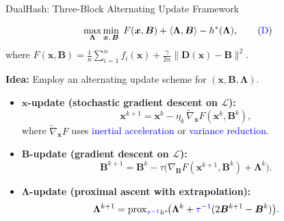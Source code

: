 \documentclass[mathserif,compress,override,9pt]{beamer}
\numberwithin{equation}{section}
\newcommand{\nii}{\noindent}
\newcommand{\prox}{\mathrm{prox}}
\newcommand{\bx}{\bm{x}}
\newcommand{\bD}{\bm{D}}
\newcommand{\bY}{\bm{Y}}
\newcommand{\bB}{\bm{B}}
\newcommand{\bLmbd}{\bm{\Lambda}}
\newcommand{\calL}{\mathcal{L}}
\newcommand{\blue}[1]{\textcolor{blue}{#1}}
\theoremstyle{remark}
\begin{document}
\begin{frame}{DualHash: Three-Block Alternating Update Framework}
\small

\begin{gather}
\max_{\bLmbd}\min_{\bx,\,\bB}\;F(\bx,\bB)+\langle\bLmbd,\bB\rangle-h^*(\bLmbd), \tag{\blue{D}}
\end{gather}
where $F(\bx,\bB)=\tfrac{1}{n}\sum_{i=1}^n f_i(\bx)+\tfrac{\gamma}{2n}\|\bD(\bx)-\bB\|^2$.


\nii\textbf{Idea:} Employ an alternating update scheme for $(\bx,\bB,\bLmbd)$.

\vspace{0.15cm}
\begin{itemize}
\item[\blue{$\triangleright$}] \textbf{$\bx$-update (stochastic gradient descent on $\calL$):}
\[
\bx^{k+1} = \bx^k - \eta_k\,\widetilde\nabla_{\bx} F(\bx^k,\bB^k),
\]
where $\widetilde\nabla_{\bx} F$ uses \blue{inertial acceleration} or \blue{variance reduction}.

\vspace{0.05cm}
\item[\blue{$\triangleright$}] \textbf{$\bB$-update (gradient descent on $\calL$):}
\[
\bB^{k+1}
= \bB^k - \tau\bigl(\nabla_{\bB} F(\bx^{k+1},\bB^k) + \bLmbd^k\bigr).
\]

\vspace{0.05cm}
\item[\blue{$\triangleright$}] \textbf{$\bLmbd$-update (proximal ascent with extrapolation):}
\[
\bLmbd^{k+1} = \prox_{\blue{\tau^{-1}} h^*}\!\bigl(\bLmbd^k + \blue{\tau^{-1}}(2\bB^{k+1}-\bB^k)\bigr).
\]
\end{itemize}

\vspace{0.1cm}
\end{frame}
\end{document}
